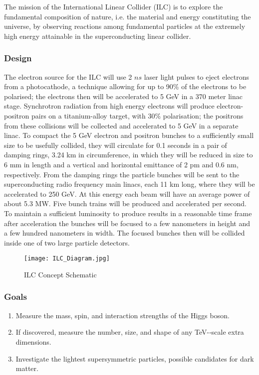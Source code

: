 The mission of the International Linear Collider (ILC) is to explore the fundamental composition of nature, i.e. the material and energy constituting the universe, by observing reactions among fundamental particles at the extremely high energy attainable in the superconducting linear collider.
 
\subsubsection{Design}

The electron source for the ILC will use 2 $ns$ laser light pulses to eject electrons from a photocathode, a technique allowing for up to 90\% of the electrons to be polarised; the electrons then will be accelerated to 5 GeV in a 370 meter linac stage. Synchrotron radiation from high energy electrons will produce electron-positron pairs on a titanium-alloy target, with 30\% polarisation; the positrons from these collisions will be collected and accelerated to 5 GeV in a separate linac.
To compact the 5 GeV electron and positron bunches to a sufficiently small size to be usefully collided, they will circulate for 0.1  seconds in a pair of damping rings, 3.24 km in circumference, in which they will be reduced in size to 6 mm in length and a vertical and horizontal emittance of 2 pm and 0.6 nm, respectively.
From the damping rings the particle bunches will be sent to the superconducting radio frequency main linacs, each 11 km long, where they will be accelerated to 250 GeV. At this energy each beam will have an average power of about 5.3 MW. Five bunch trains will be produced and accelerated per second.
To maintain a sufficient luminosity to produce results in a reasonable time frame after acceleration the bunches will be focused to a few nanometers in height and a few hundred nanometers in width. The focused bunches then will be collided inside one of two large particle detectors.

\begin{figure}[!htb]
\centering
\texttt{[image: ILC\_Diagram.jpg]}
\caption{ILC Concept Schematic \cite{ILC:Images}}
\end{figure}

\subsubsection{Goals \cite{ILC:TechnicalDesignReport}}

\begin{enumerate}
  \item Measure the mass, spin, and interaction strengths of the Higgs boson.
  \item If discovered, measure the number, size, and shape of any TeV-­‐scale extra     dimensions.                                         
  \item Investigate the lightest supersymmetric particles, possible candidates for dark matter.
\end{enumerate}

